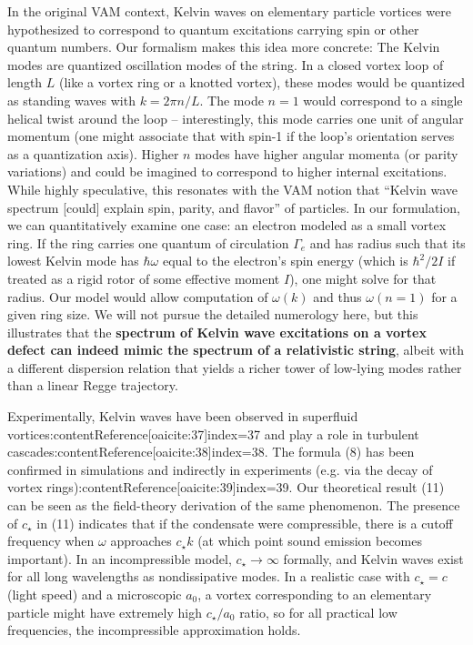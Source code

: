 \documentclass[12pt]{article}
\begin{document}
In the original VAM context, Kelvin waves on elementary particle vortices were hypothesized to correspond to quantum excitations carrying spin or other quantum numbers. Our formalism makes this idea more concrete: The Kelvin modes are quantized oscillation modes of the string. In a closed vortex loop of length $L$ (like a vortex ring or a knotted vortex), these modes would be quantized as standing waves with $k = 2\pi n/L$. The mode $n=1$ would correspond to a single helical twist around the loop – interestingly, this mode carries one unit of angular momentum (one might associate that with spin-1 if the loop’s orientation serves as a quantization axis). Higher $n$ modes have higher angular momenta (or parity variations) and could be imagined to correspond to higher internal excitations. While highly speculative, this resonates with the VAM notion that “Kelvin wave spectrum [could] explain spin, parity, and flavor” of particles. In our formulation, we can quantitatively examine one case: an electron modeled as a small vortex ring. If the ring carries one quantum of circulation $\Gamma_e$ and has radius such that its lowest Kelvin mode has $\hbar \omega$ equal to the electron’s spin energy (which is $\hbar^2/2I$ if treated as a rigid rotor of some effective moment $I$), one might solve for that radius. Our model would allow computation of $\omega(k)$ and thus $\omega(n=1)$ for a given ring size. We will not pursue the detailed numerology here, but this illustrates that the \textbf{spectrum of Kelvin wave excitations on a vortex defect can indeed mimic the spectrum of a relativistic string}, albeit with a different dispersion relation that yields a richer tower of low-lying modes rather than a linear Regge trajectory.

Experimentally, Kelvin waves have been observed in superfluid vortices:contentReference[oaicite:37]{index=37} and play a role in turbulent cascades:contentReference[oaicite:38]{index=38}. The formula (8) has been confirmed in simulations and indirectly in experiments (e.g. via the decay of vortex rings):contentReference[oaicite:39]{index=39}. Our theoretical result (11) can be seen as the field-theory derivation of the same phenomenon. The presence of $c_\star$ in (11) indicates that if the condensate were compressible, there is a cutoff frequency when $\omega$ approaches $c_\star k$ (at which point sound emission becomes important). In an incompressible model, $c_\star \to \infty$ formally, and Kelvin waves exist for all long wavelengths as nondissipative modes. In a realistic case with $c_\star = c$ (light speed) and a microscopic $a_0$, a vortex corresponding to an elementary particle might have extremely high $c_\star/a_0$ ratio, so for all practical low frequencies, the incompressible approximation holds.
\end{document}
